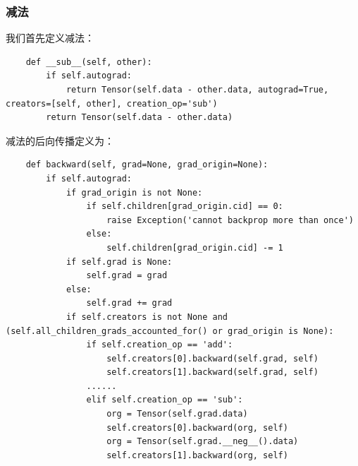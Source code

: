\subsubsection{减法}
我们首先定义减法：
\begin{lstlisting}
    def __sub__(self, other):
        if self.autograd:
            return Tensor(self.data - other.data, autograd=True, creators=[self, other], creation_op='sub')
        return Tensor(self.data - other.data)
\end{lstlisting}
减法的后向传播定义为：
\begin{lstlisting}
    def backward(self, grad=None, grad_origin=None):
        if self.autograd:
            if grad_origin is not None:
                if self.children[grad_origin.cid] == 0:
                    raise Exception('cannot backprop more than once')
                else:
                    self.children[grad_origin.cid] -= 1
            if self.grad is None:
                self.grad = grad
            else:
                self.grad += grad
            if self.creators is not None and (self.all_children_grads_accounted_for() or grad_origin is None):
                if self.creation_op == 'add':
                    self.creators[0].backward(self.grad, self)
					self.creators[1].backward(self.grad, self)
				......
                elif self.creation_op == 'sub':
                    org = Tensor(self.grad.data)
                    self.creators[0].backward(org, self)
                    org = Tensor(self.grad.__neg__().data)
                    self.creators[1].backward(org, self)
\end{lstlisting}



